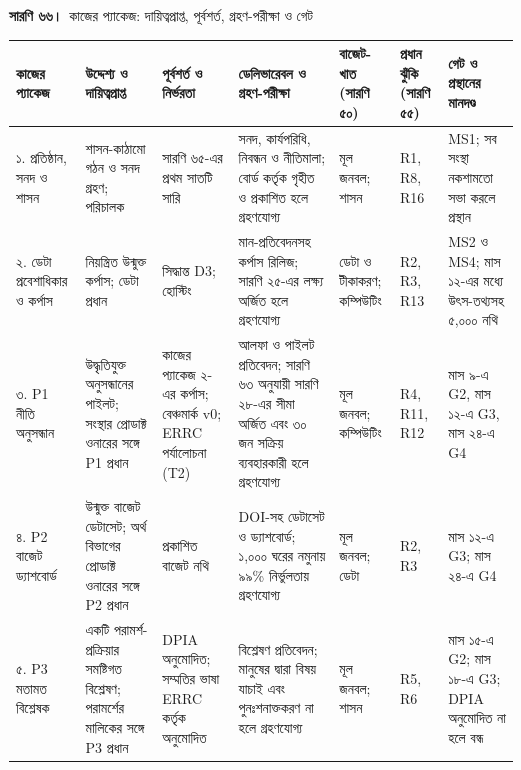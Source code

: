 \documentclass[border=10pt]{standalone}
\begin{document}
\begin{minipage}{22cm}
{\large\bfseries সারণি ৬৬।}\ {\large কাজের প্যাকেজ: দায়িত্বপ্রাপ্ত, পূর্বশর্ত, গ্রহণ-পরীক্ষা ও গেট}\par\vspace{7pt}
\small
{}
\begin{tabularx}{\linewidth}{@{}>{\hsize=0.868\hsize\raggedright\arraybackslash}X>{\hsize=1.157\hsize\raggedright\arraybackslash}X>{\hsize=1.157\hsize\raggedright\arraybackslash}X>{\hsize=1.331\hsize\raggedright\arraybackslash}X>{\hsize=0.810\hsize\raggedright\arraybackslash}X>{\hsize=0.636\hsize\raggedright\arraybackslash}X>{\hsize=1.041\hsize\raggedright\arraybackslash}X@{}}
\arrayrulecolor{bapilrule}\toprule
\rowcolor{white}\textbf{কাজের প্যাকেজ} & \textbf{উদ্দেশ্য ও দায়িত্বপ্রাপ্ত} & \textbf{পূর্বশর্ত ও নির্ভরতা} & \textbf{ডেলিভারেবল ও গ্রহণ-পরীক্ষা} & \textbf{বাজেট-খাত (সারণি ৫০)} & \textbf{প্রধান ঝুঁকি (সারণি ৫৫)} & \textbf{গেট ও প্রস্থানের মানদণ্ড} \\
\midrule
১. প্রতিষ্ঠান, সনদ ও শাসন & শাসন-কাঠামো গঠন ও সনদ গ্রহণ; পরিচালক & সারণি ৬৫-এর প্রথম সাতটি সারি & সনদ, কার্যপরিধি, নিবন্ধন ও নীতিমালা; বোর্ড কর্তৃক গৃহীত ও প্রকাশিত হলে গ্রহণযোগ্য & মূল জনবল; শাসন & R1, R8, R16 & MS1; সব সংস্থা নকশামতো সভা করলে প্রস্থান \\
২. ডেটা প্রবেশাধিকার ও কর্পাস & নিয়ন্ত্রিত উন্মুক্ত কর্পাস; ডেটা প্রধান & সিদ্ধান্ত D3; হোস্টিং & মান-প্রতিবেদনসহ কর্পাস রিলিজ; সারণি ২৫-এর লক্ষ্য অর্জিত হলে গ্রহণযোগ্য & ডেটা ও টীকাকরণ; কম্পিউটিং & R2, R3, R13 & MS2 ও MS4; মাস ১২-এর মধ্যে উৎস-তথ্যসহ ৫,০০০ নথি \\
৩. P1 নীতি অনুসন্ধান & উদ্ধৃতিযুক্ত অনুসন্ধানের পাইলট; সংস্থার প্রোডাক্ট ওনারের সঙ্গে P1 প্রধান & কাজের প্যাকেজ ২-এর কর্পাস; বেঞ্চমার্ক v0; ERRC পর্যালোচনা (T2) & আলফা ও পাইলট প্রতিবেদন; সারণি ৬৩ অনুযায়ী সারণি ২৮-এর সীমা অর্জিত এবং ৩০ জন সক্রিয় ব্যবহারকারী হলে গ্রহণযোগ্য & মূল জনবল; কম্পিউটিং & R4, R11, R12 & মাস ৯-এ G2, মাস ১২-এ G3, মাস ২৪-এ G4 \\
৪. P2 বাজেট ড্যাশবোর্ড & উন্মুক্ত বাজেট ডেটাসেট; অর্থ বিভাগের প্রোডাক্ট ওনারের সঙ্গে P2 প্রধান & প্রকাশিত বাজেট নথি & DOI-সহ ডেটাসেট ও ড্যাশবোর্ড; ১,০০০ ঘরের নমুনায় ৯৯\% নির্ভুলতায় গ্রহণযোগ্য & মূল জনবল; ডেটা & R2, R3 & মাস ১২-এ G3; মাস ২৪-এ G4 \\
৫. P3 মতামত বিশ্লেষক & একটি পরামর্শ-প্রক্রিয়ার সমষ্টিগত বিশ্লেষণ; পরামর্শের মালিকের সঙ্গে P3 প্রধান & DPIA অনুমোদিত; সম্মতির ভাষা ERRC কর্তৃক অনুমোদিত & বিশ্লেষণ প্রতিবেদন; মানুষের দ্বারা বিষয় যাচাই এবং পুনঃশনাক্তকরণ না হলে গ্রহণযোগ্য & মূল জনবল; শাসন & R5, R6 & মাস ১৫-এ G2; মাস ১৮-এ G3; DPIA অনুমোদিত না হলে বন্ধ \\

\end{tabularx}
\end{minipage}
\end{document}
